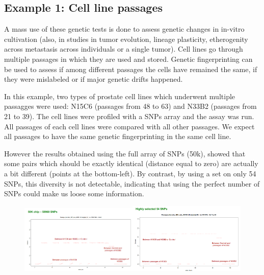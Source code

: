 \subsection*{Example 1: Cell line passages}

A mass use of these genetic tests is done to assess genetic changes in in-vitro cultivation (also, in studies in tumor evolution, lineage plasticity, etherogenity across metastasis across individuals or a single tumor).
Cell lines go through multiple passages in which they are used and stored. Genetic fingerprinting can be used to assess if among different passages the cells have remained the same, if they were mislabeled or if major genetic drifts happened.

In this example, two types of prostate cell lines which underwent multiple passagges were used: N15C6 (passages from 48 to 63) and N33B2 (passages from 21 to 39).
The cell lines were profiled with a SNPs array and the assay was run.
All passages of each cell lines were compared with all other passages. We expect all passages to have the same genetic fingerprinting in the same cell line.  

However the results obtained using the full array of SNPs (50k), showed that some pairs which should be exactly identical (distance equal to zero) are actually a bit different (points at the bottom-left).
By contrast, by using a set on only 54 SNPs, this diversity is not detectable, indicating  that using the perfect number of SNPs could make us loose some information. 

\begin{figure}
	\centering
	\includegraphics[width=0.5\textwidth]{Images/cell_lines_1.PNG}\quad\includegraphics[width=0.5\textwidth]{Images/cell_lines_2.PNG}
	\caption{\label{fig: cell_lines}}
\end{figure}

